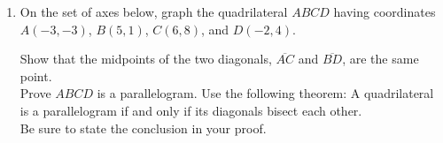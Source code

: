 \documentclass[12pt, twoside]{article}
\begin{document}
\begin{enumerate}
 \newpage
   \item On the set of axes below, graph the quadrilateral $ABCD$ having coordinates $A(-3,-3)$, $B(5,1)$, $C(6,8)$, and $D(-2,4)$.
     \begin{center} %
     \end{center}
     Show that the midpoints of the two diagonals, $\overline{AC}$ and $\overline{BD}$, are the same point. \\[5cm]
     Prove $ABCD$ is a parallelogram. Use the following theorem:
     A quadrilateral is a parallelogram if and only if its diagonals bisect each other. \\[0.5cm]
     Be sure to state the conclusion in your proof.

  \end{enumerate}
  \newpage
  \setcounter{page}{1}
\end{document}
